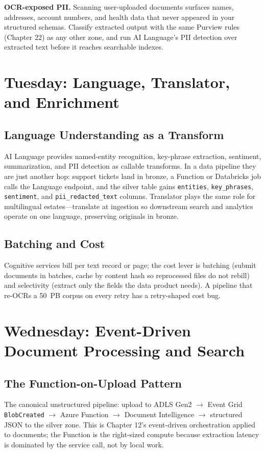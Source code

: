 \begin{pitfall}
\textbf{OCR-exposed PII.} Scanning user-uploaded documents surfaces names, addresses, account numbers, and health data that never appeared in your structured schemas. Classify extracted output with the same Purview rules (Chapter 22) as any other zone, and run AI Language's PII detection over extracted text before it reaches searchable indexes.
\end{pitfall}

\section{Tuesday: Language, Translator, and Enrichment}

\subsection{Language Understanding as a Transform}
AI Language provides named-entity recognition, key-phrase extraction, sentiment, summarization, and PII detection as callable transforms. In a data pipeline they are just another hop: support tickets land in bronze, a Function or Databricks job calls the Language endpoint, and the silver table gains \texttt{entities}, \texttt{key\_phrases}, \texttt{sentiment}, and \texttt{pii\_redacted\_text} columns. Translator plays the same role for multilingual estates---translate at ingestion so downstream search and analytics operate on one language, preserving originals in bronze.

\subsection{Batching and Cost}
Cognitive services bill per text record or page; the cost lever is batching (submit documents in batches, cache by content hash so reprocessed files do not rebill) and selectivity (extract only the fields the data product needs). A pipeline that re-OCRs a 50~PB corpus on every retry has a retry-shaped cost bug.

\section{Wednesday: Event-Driven Document Processing and Search}

\subsection{The Function-on-Upload Pattern}
The canonical unstructured pipeline: upload to ADLS Gen2 $\rightarrow$ Event Grid \texttt{BlobCreated} $\rightarrow$ Azure Function $\rightarrow$ Document Intelligence $\rightarrow$ structured JSON to the silver zone. This is Chapter 12's event-driven orchestration applied to documents; the Function is the right-sized compute because extraction latency is dominated by the service call, not by local work.

